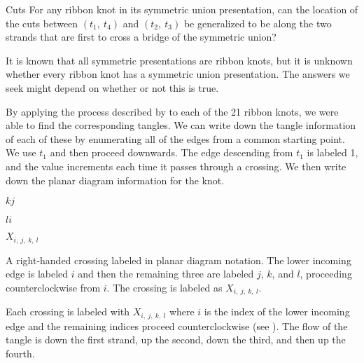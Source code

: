 \begin{paper}
\begin{paperqtn}{Cuts}
For any ribbon knot in its symmetric union presentation, can the location of the
cuts between $(t_1,~t_4)$ and $(t_2,~t_3)$ be generalized to be along the
two strands that are first to cross a bridge of the symmetric union?
\end{paperqtn}

It is known that all symmetric presentations are ribbon knots, but it is unknown
whether every ribbon knot has a symmetric union presentation.
The answers we seek might depend on whether or not this is true.


By applying the process described by \thmRibbon to each of the 21 ribbon knots,
we were able to find the corresponding tangles.
We can write down the tangle information of each of these by enumerating all of
the edges from a common starting point.
We use $t_1$ and then proceed downwards.
The edge descending from $t_1$ is labeled 1, and the value increments each time
it passes through a crossing.
We then write down the planar diagram information for the knot.

{\hspace{0.3in}\hspace{0.275\columnwidth}$k$\hspace{0.2\columnwidth}$j$
\vspace{-0.5em}\begin{center}\end{center}
\vspace{-0.5em}
\hspace{0.3in}\hspace{0.275\columnwidth}$l$\hspace{0.2\columnwidth}$i$

\hspace{0.3in}\hspace{0.31\columnwidth}$X_{i,~j,~k,~l}$}
{A right-handed crossing labeled in planar diagram notation.
The lower incoming edge is labeled $i$ and then the remaining three are
labeled $j$, $k$, and $l$, proceeding counterclockwise from $i$.
The crossing is labeled as $X_{i,~j,~k,~l}$.}

Each crossing is labeled with $X_{i,~j,~k,~l}$ where $i$ is the index of the
lower incoming edge and the remaining indices proceed counterclockwise (see
\figCrossing).
The flow of the tangle is down the first strand, up the second, down the third,
and then up the fourth.


\end{paper}

